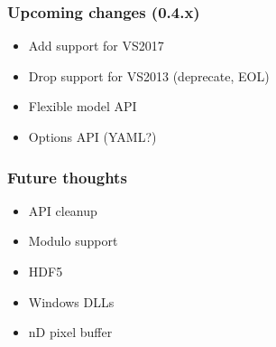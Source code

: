 \documentclass{beamer}
\begin{document}
\begin{frame}[fragile]
  \frametitle{Upcoming changes (0.4.x)}

  \begin{itemize}
  \item Add support for VS2017
  \item Drop support for VS2013 (deprecate, EOL)
  \item Flexible model API
  \item Options API (YAML?)
  \end{itemize}
\end{frame}

\begin{frame}[fragile]
  \frametitle{Future thoughts}

  \begin{itemize}
  \item API cleanup
  \item Modulo support
  \item HDF5
  \item Windows DLLs
  \item nD pixel buffer
  \end{itemize}
\end{frame}
\end{document}
